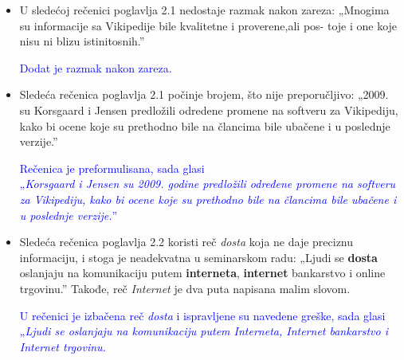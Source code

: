 \documentclass[a4paper]{report}
\newcommand{\odgovor}[1]{\textcolor{blue}{#1}}
\begin{document}
\begin{itemize}
    \item U sledećoj rečenici poglavlja 2.1 nedostaje razmak nakon zareza:\newline
    „Mnogima su informacije sa Vikipedije bile kvalitetne i proverene,ali pos-
toje i one koje nisu ni blizu istinitosnih.”
	
	\odgovor{Dodat je razmak nakon zareza.}
	
\end{itemize}
\begin{itemize}
    \item Sledeća rečenica poglavlja 2.1 počinje brojem, što nije preporučljivo: \newline
    „2009. su Korsgaard i Jensen
predložili odredene promene na softveru za Vikipediju, kako bi ocene koje
su prethodno bile na člancima bile ubačene i u poslednje verzije.”
	
	\odgovor{Rečenica je preformulisana, sada glasi \\„\textit{Korsgaard i Jensen su 2009. godine predložili određene promene na softveru za Vikipediju, kako bi ocene koje su prethodno bile na člancima bile ubačene i u poslednje verzije.}”}
	
\end{itemize}
\begin{itemize}
    \item Sledeća rečenica poglavlja 2.2 koristi reč \textit{dosta} koja ne daje preciznu informaciju, i stoga je neadekvatna u seminarskom radu:\newline
    „Ljudi se \textbf{dosta} oslanjaju na komunikaciju putem \textbf{interneta}, \textbf{internet} bankarstvo
i online trgovinu.”\newline
Takođe, reč \textit{Internet} je dva puta napisana malim slovom.

	\odgovor{U rečenici je izbačena reč \textit{dosta} i ispravljene su navedene greške, sada glasi „\textit{Ljudi se oslanjaju na komunikaciju putem Interneta, Internet bankarstvo i Internet trgovinu.}}
	
\end{itemize}
\end{document}

